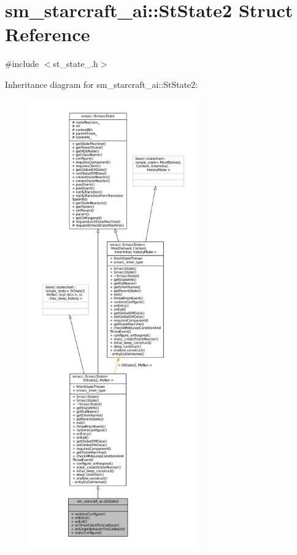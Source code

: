 \hypertarget{structsm__starcraft__ai_1_1StState2}{}\section{sm\+\_\+starcraft\+\_\+ai\+:\+:St\+State2 Struct Reference}
\label{structsm__starcraft__ai_1_1StState2}


{\ttfamily \#include $<$st\+\_\+state\+\_.\+h$>$}



Inheritance diagram for sm\+\_\+starcraft\+\_\+ai\+:\+:St\+State2\+:
\nopagebreak
\begin{figure}[H]
\begin{center}
\leavevmode
\includegraphics[height=550pt]{structsm__starcraft__ai_1_1StState2__inherit__graph}
\end{center}
\end{figure}


